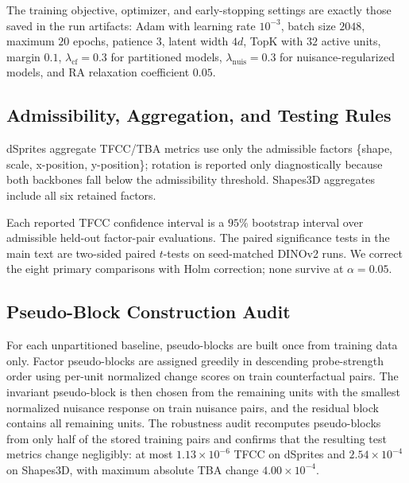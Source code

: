 \documentclass[10pt,twocolumn]{article}
\newcommand{\tfcc}{\textsc{TFCC}}
\newcommand{\tba}{\textsc{TBA}}
\begin{document}
The training objective, optimizer, and early-stopping settings are exactly those saved in the run artifacts: Adam with learning rate $10^{-3}$, batch size $2048$, maximum $20$ epochs, patience $3$, latent width $4d$, TopK with $32$ active units, margin $0.1$, $\lambda_{\mathrm{cf}} = 0.3$ for partitioned models, $\lambda_{\mathrm{nuis}} = 0.3$ for nuisance-regularized models, and RA relaxation coefficient $0.05$.

\subsection{Admissibility, Aggregation, and Testing Rules}
dSprites aggregate \tfcc{}/\tba{} metrics use only the admissible factors \{shape, scale, x-position, y-position\}; rotation is reported only diagnostically because both backbones fall below the admissibility threshold. Shapes3D aggregates include all six retained factors.

Each reported \tfcc{} confidence interval is a $95\%$ bootstrap interval over admissible held-out factor-pair evaluations. The paired significance tests in the main text are two-sided paired $t$-tests on seed-matched DINOv2 runs. We correct the eight primary comparisons with Holm correction; none survive at $\alpha = 0.05$.

\subsection{Pseudo-Block Construction Audit}
For each unpartitioned baseline, pseudo-blocks are built once from training data only. Factor pseudo-blocks are assigned greedily in descending probe-strength order using per-unit normalized change scores on train counterfactual pairs. The invariant pseudo-block is then chosen from the remaining units with the smallest normalized nuisance response on train nuisance pairs, and the residual block contains all remaining units. The robustness audit recomputes pseudo-blocks from only half of the stored training pairs and confirms that the resulting test metrics change negligibly: at most $1.13 \times 10^{-6}$ \tfcc{} on dSprites and $2.54 \times 10^{-4}$ on Shapes3D, with maximum absolute \tba{} change $4.00 \times 10^{-4}$.
\end{document}
